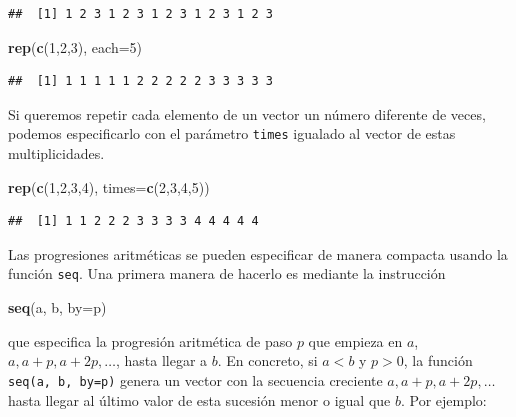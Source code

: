 \documentclass[]{book}
\newenvironment{Shaded}{\begin{snugshade}}{\end{snugshade}}
\newcommand{\DataTypeTok}[1]{\textcolor[rgb]{0.13,0.29,0.53}{#1}}
\newcommand{\DecValTok}[1]{\textcolor[rgb]{0.00,0.00,0.81}{#1}}
\newcommand{\KeywordTok}[1]{\textcolor[rgb]{0.13,0.29,0.53}{\textbf{#1}}}
\newcommand{\NormalTok}[1]{#1}
\theoremstyle{definition}
\theoremstyle{definition}
\theoremstyle{definition}
\theoremstyle{remark}
\begin{document}
\begin{verbatim}
##  [1] 1 2 3 1 2 3 1 2 3 1 2 3 1 2 3
\end{verbatim}

\begin{Shaded}
\begin{Highlighting}[]
\KeywordTok{rep}\NormalTok{(}\KeywordTok{c}\NormalTok{(}\DecValTok{1}\NormalTok{,}\DecValTok{2}\NormalTok{,}\DecValTok{3}\NormalTok{), }\DataTypeTok{each=}\DecValTok{5}\NormalTok{)}
\end{Highlighting}
\end{Shaded}

\begin{verbatim}
##  [1] 1 1 1 1 1 2 2 2 2 2 3 3 3 3 3
\end{verbatim}

Si queremos repetir cada elemento de un vector un número diferente de veces, podemos especificarlo con el parámetro \texttt{times} igualado al vector de estas multiplicidades.

\begin{Shaded}
\begin{Highlighting}[]
\KeywordTok{rep}\NormalTok{(}\KeywordTok{c}\NormalTok{(}\DecValTok{1}\NormalTok{,}\DecValTok{2}\NormalTok{,}\DecValTok{3}\NormalTok{,}\DecValTok{4}\NormalTok{), }\DataTypeTok{times=}\KeywordTok{c}\NormalTok{(}\DecValTok{2}\NormalTok{,}\DecValTok{3}\NormalTok{,}\DecValTok{4}\NormalTok{,}\DecValTok{5}\NormalTok{)) }
\end{Highlighting}
\end{Shaded}

\begin{verbatim}
##  [1] 1 1 2 2 2 3 3 3 3 4 4 4 4 4
\end{verbatim}

Las progresiones aritméticas se pueden especificar de manera compacta usando la función \texttt{seq}. Una primera manera de hacerlo es mediante la instrucción

\begin{Shaded}
\begin{Highlighting}[]
\KeywordTok{seq}\NormalTok{(a, b, }\DataTypeTok{by=}\NormalTok{p)}
\end{Highlighting}
\end{Shaded}

que especifica la progresión aritmética de paso \(p\) que empieza en \(a\),
\(a, a+p, a+2p, \ldots\), hasta llegar a \(b\). En concreto, si \(a<b\) y \(p>0\), la función \texttt{seq(a,\ b,\ by=p)} genera un vector con la secuencia creciente
\(a,a+p,a+2p,\ldots\) hasta llegar al último valor de esta sucesión menor o igual que \(b\). Por ejemplo:
\end{document}
